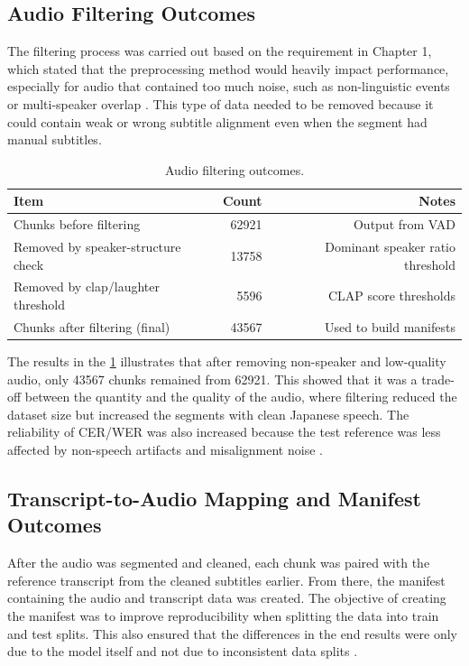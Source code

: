 \subsection{Audio Filtering Outcomes}
The filtering process was carried out based on the requirement in Chapter 1, which stated that the preprocessing method would heavily impact performance, especially for audio that contained too much noise, such as non-linguistic events or multi-speaker overlap \parencite{latif2020}. This type of data needed to be removed because it could contain weak or wrong subtitle alignment even when the segment had manual subtitles.

\begin{table}[H]
\centering
\caption{Audio filtering outcomes.}
\label{tab:filtering_results}
{\small
\setlength{\tabcolsep}{6pt}
\renewcommand{\arraystretch}{1.2}
\begin{tabular}{lrr}
\hline
\textbf{Item} & \textbf{Count} & \textbf{Notes} \\
\hline
Chunks before filtering & {62921} & Output from VAD \\
Removed by speaker-structure check & {13758} & Dominant speaker ratio threshold \\
Removed by clap/laughter threshold & {5596} & CLAP score thresholds \\
Chunks after filtering (final) & {43567} & Used to build manifests \\
\hline
\end{tabular}}
\end{table}

The results in the \cref{tab:filtering_results} illustrates that after removing non-speaker and low-quality audio, only {43567} chunks remained from {62921}. This showed that it was a trade-off between the quantity and the quality of the audio, where filtering reduced the dataset size but increased the segments with clean Japanese speech. The reliability of CER/WER was also increased because the test reference was less affected by non-speech artifacts and misalignment noise \parencite{ando2021}.


\subsection{Transcript-to-Audio Mapping and Manifest Outcomes}
After the audio was segmented and cleaned, each chunk was paired with the reference transcript from the cleaned subtitles earlier. From there, the manifest containing the audio and transcript data was created. The objective of creating the manifest was to improve reproducibility when splitting the data into train and test splits. This also ensured that the differences in the end results were only due to the model itself and not due to inconsistent data splits \parencite{ravanelli2021speechbraingeneralpurposespeechtoolkit}.

